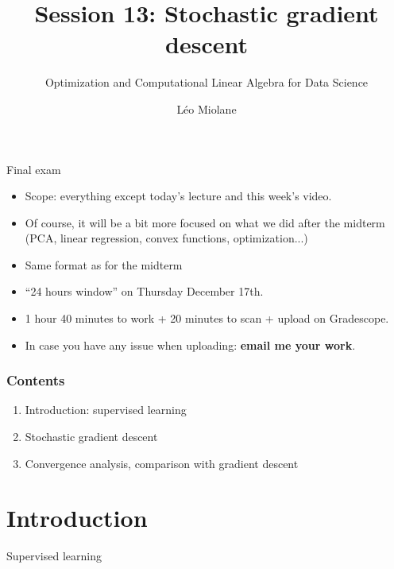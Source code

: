 \documentclass{beamer}
\title{Session 13: Stochastic gradient descent}
\subtitle{Optimization and Computational Linear Algebra for Data Science}
\author{Léo Miolane}
\date{}
\begin{document}
\setcounter{showProgressBar}{0}
\setcounter{showSlideNumbers}{0}

\frame{\titlepage}
\setcounter{framenumber}{0}
\setcounter{showSlideNumbers}{1}


\begin{frame}{Final exam}
	\begin{itemize}
		\item Scope: everything except today's lecture and this week's video.
			\vspace{1mm}
		\item Of course, it will be a bit more focused on what we did after the midterm (PCA, linear regression, convex functions, optimization...)
			\vspace{2mm}
		\item Same format as for the midterm
			\vspace{2mm}
		\item ``24 hours window'' on Thursday December 17th.
			\vspace{2mm}
		\item 1 hour 40 minutes to work + 20 minutes to scan + upload on Gradescope.
			\vspace{2mm}
		\item In case you have any issue when uploading: \textbf{email me your work}.
	\end{itemize}
\end{frame}

\begin{frame}
	\frametitle{Contents}
	\begin{enumerate}
		\item Introduction: supervised learning
		\item Stochastic gradient descent
		\item Convergence analysis, comparison with gradient descent
	\end{enumerate}
\end{frame}


\section{Introduction}


\begin{frame}[t]{Supervised learning}
	\grid

	\pause
	\pause

\end{frame}
\end{document}
